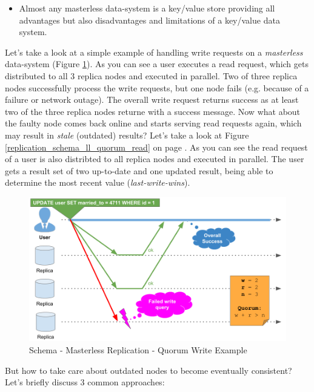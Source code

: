 {\begin{itemize}
\item Almost any masterless data-system is a key/value store providing all advantages but also disadvantages and limitations of a key/value data system.\\
\end{itemize}

\newpage
{}
Let's take a look at a simple example of handling write requests on a \textit{masterless} data-system (Figure \ref{replication_schema_ll_quorum_write}). As you can see a user executes a read request, which gets distributed to all 3 replica nodes and executed in parallel. Two of three replica nodes successfully process the write requests, but one node fails (e.g. because of a failure or network outage). The overall write request returns success as at least two of the three replica nodes returne with a success message. Now what about the faulty node comes back online and starts serving read requests again, which may result in \textit{stale} (outdated) results? Let's take a look at Figure \ref{replication_schema_ll_quorum_read} on page \pageref{replication_schema_ll_quorum_read}. As you can see the read request of a user is also distribted to all replica nodes and executed in parallel. The user gets a result set of two up-to-date and one updated result, being able to determine the most recent value (\textit{last-write-wins}). \\

\begin{figure}[h]
	\centering
  \includegraphics[width=1\textwidth]{replication_schema_ll_quorum_write.png}
	\caption{Schema - Masterless Replication - Quorum Write Example}
	\label{replication_schema_ll_quorum_write}
\end{figure}

But how to take care about outdated nodes to become eventually consistent? Let's briefly discuss 3 common approaches:\\

}
